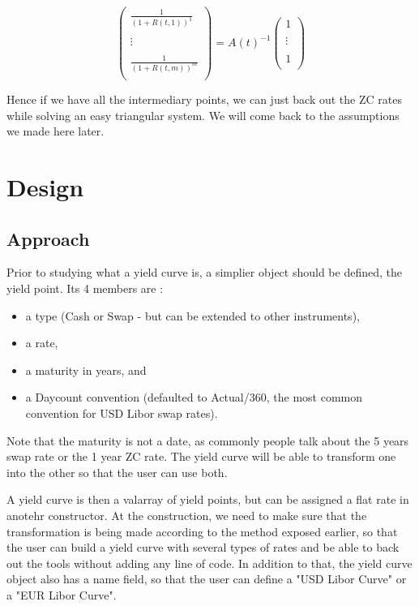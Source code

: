 $$\left(
\begin{array}{c}
\frac{1}{\left(1+R(t,1)\right)^1} \\
\\
\vdots\\
\\
\frac{1}{\left(1+R(t,m)\right)^m} \\
\end{array}
\right)= A(t)^{-1} \left(
\begin{array}{c}
1 \\
\\
\vdots\\
\\
1 \\
\end{array}
\right)
$$

\par Hence if we have all the intermediary points, we can just back out the ZC rates while solving an easy triangular system.
We will come back to the assumptions we made here later.


\section{Design }


\subsection{Approach}
\par Prior to studying what a yield curve is, a simplier object should be defined, the yield point. Its 4 members are :
\begin{itemize}
    \item a type (Cash or Swap - but can be extended to other instruments),
    \item a rate,
    \item a maturity in years, and
    \item a Daycount convention (defaulted to Actual/360, the most common convention for USD Libor swap rates).
\end{itemize}
\par Note that the maturity is not a date, as commonly people talk about the 5 years swap rate or the 1 year ZC rate. The yield curve will be able to transform one into the other so that the user can use both.

\par A yield curve is then a valarray of yield points, but can be assigned a flat rate in anotehr constructor. At the construction, we need to make sure that the transformation is being made according to the method exposed earlier, so that the user can build a yield curve with several types of rates and be able to back out the tools without adding any line of code. In addition to that, the yield curve object also has a name field, so that the user can define a "USD Libor Curve" or a "EUR Libor Curve".

